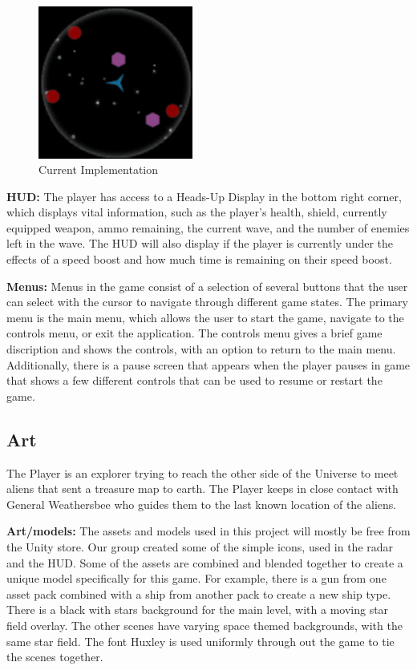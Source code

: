 \documentclass[12pt]{article}       %
\def\hs{\hspace{15pt}}
\begin{document}
\begin{figure} [H]
\centering
\includegraphics[width=2in]{radarExample2.png}
\caption{Current Implementation} \label{RadarTwo}
\end{figure}

	{\bf HUD:} The player has access to a Heads-Up Display in the bottom right corner, which displays vital information, such as the player's health, shield, currently equipped weapon, ammo remaining, the current wave, and the number of enemies left in the wave. The HUD will also display if the player is currently under the effects of a speed boost and how much time is remaining on their speed boost.

	{\bf Menus:} Menus in the game consist of a selection of several buttons that the user can select with the cursor to navigate through different game states. The primary menu is the main menu, which allows the user to start the game, navigate to the controls menu, or exit the application. The controls menu gives a brief game discription and shows the controls, with an option to return to the main menu. Additionally, there is a pause screen that appears when the player pauses in game that shows a few different controls that can be used to resume or restart the game.

\subsection{Art} %

	\hs {\bf Story:} The Player is an explorer trying to reach the other side of the Universe to meet aliens that sent a treasure map to earth. The Player keeps in close contact with General Weathersbee who guides them to the last known location of the aliens. 

	{\bf Art/models:} The assets and models used in this project will mostly be free from the Unity store. Our group created some of the simple icons, used in the radar and the HUD. Some of the assets are combined and blended together to create a unique model specifically for this game. For example, there is a gun from one asset pack combined with a ship from another pack to create a new ship type. There is a black with stars background for the main level, with a moving star field overlay. The other scenes have varying space themed backgrounds, with the same star field. The font Huxley is used uniformly through out the game to tie the scenes together.  
\end{document}
